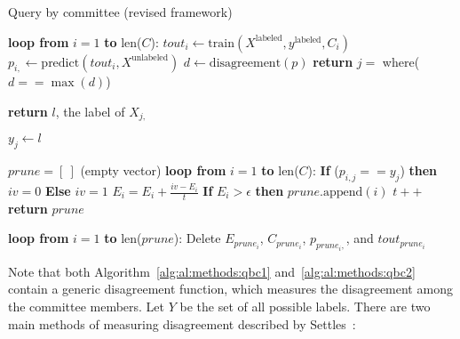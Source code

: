 \tablespacing
\begin{algorithm}[H]
	\caption{Query by committee (revised framework)}\label{alg:al:methods:qbc2}
	\begin{algorithmic}[1]
		
		\State \textbf{loop from} $i=1$ \textbf{to} len($C$):
		\State \indent $\textit{tout}_i \gets 
		\text{train}(X^{\text{labeled}},y^{\text{labeled}},C_i)$
		\State \indent $p_{i,} \gets 
		\text{predict}(\textit{tout}_i,X^{\text{unlabeled}})$
		\State $d \gets \text{disagreement}(p)$
		\State \textbf{return} $j =$ where($d==\max{(d)}$)
		\EndFunction
		
		\State \textbf{return} $l$, the label of $X_{j,}$
		\EndFunction
		
		\State $y_j \gets l$
		
		\State $prune = [\ ]$ (empty vector)	
		\State \textbf{loop from} $i=1$ \textbf{to} len($C$):
		\State \indent \textbf{If} ($p_{i,j}==y_j$) \textbf{then} $iv = 0$ 
		\textbf{Else} $iv = 1$
		\State \indent $E_i = E_i + \frac{iv - E_i}{t}$
		\State \indent \textbf{If} $E_i>\epsilon$ \textbf{then} 
		$prune.\text{append}(i)$
		\State $t++$
		\State \textbf{return} $prune$
		\EndFunction
		
		\State \textbf{loop from} $i=1$ \textbf{to} len($prune$):
		\State \indent Delete $E_{prune_i}$, $C_{prune_i}$, $p_{prune_i,}$, 
		and $\textit{tout}_{prune_i}$
		
		\EndProcedure
	\end{algorithmic}
\end{algorithm}
\bodyspacing

Note that both Algorithm~\ref{alg:al:methods:qbc1} 
and~\ref{alg:al:methods:qbc2} contain a generic disagreement function, which 
measures the disagreement among the committee members. Let $Y$ be the set of 
all possible labels. There are two main methods of measuring disagreement 
described by Settles~\cite{settles2010}:

